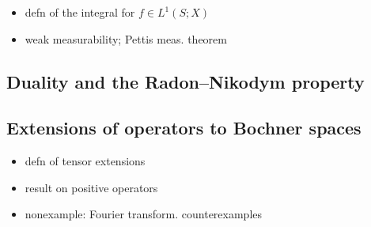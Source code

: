 \begin{itemize}
\item defn of the integral for $f \in L^1(S;X)$
\item weak measurability; Pettis meas. theorem
\end{itemize}


\subsection{Duality and the Radon--Nikodym property}

\subsection{Extensions of operators to Bochner spaces}

\begin{itemize}
\item defn of tensor extensions
\item result on positive operators
\item nonexample: Fourier transform. counterexamples
\end{itemize}





